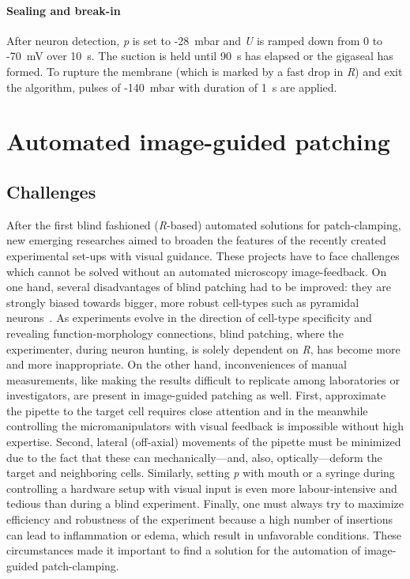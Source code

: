 \documentclass[12pt,a4paper]{report}
\begin{document}
\subsubsection{Sealing and break-in}
After neuron detection, \textit{p} is set to -28~mbar and \textit{U} is ramped down from 0 to -70~mV over 10~s. The suction is held until 90~s has elapsed or the gigaseal has formed. To rupture the membrane (which is marked by a fast drop in \textit{R}) and exit the algorithm, pulses of -140~mbar with duration of 1~s are applied.

\chapter{Automated image-guided patching}

\section{Challenges}
After the first blind fashioned (\textit{R}-based) automated solutions for patch-clamping, new emerging researches aimed to broaden the features of the recently created experimental set-ups with visual guidance. These projects have to face challenges which cannot be solved without an automated microscopy image-feedback. On one hand, several disadvantages of blind patching had to be improved: they are strongly biased towards bigger, more robust cell-types such as pyramidal neurons~\cite{long2015}. As experiments evolve in the direction of cell-type specificity and revealing function-morphology connections, blind patching, where the experimenter, during neuron hunting, is solely dependent on \textit{R}, has become more and more inappropriate. On the other hand, inconveniences of manual measurements, like making the results difficult to replicate among laboratories or investigators, are present in image-guided patching as well. First, approximate the pipette to the target cell requires close attention and in the meanwhile controlling the micromanipulators with visual feedback is impossible without high expertise. Second, lateral (off-axial) movements of the pipette must be minimized due to the fact that these can mechanically---and, also, optically---deform the target and neighboring cells. Similarly, setting \textit{p} with mouth or a syringe during controlling a hardware setup with visual input is even more labour-intensive and tedious than during a blind experiment. Finally, one must always try to maximize efficiency and robustness of the experiment because a high number of insertions can lead to inflammation or edema, which result in unfavorable conditions. These circumstances made it important to find a solution for the automation of image-guided patch-clamping.
\end{document}
